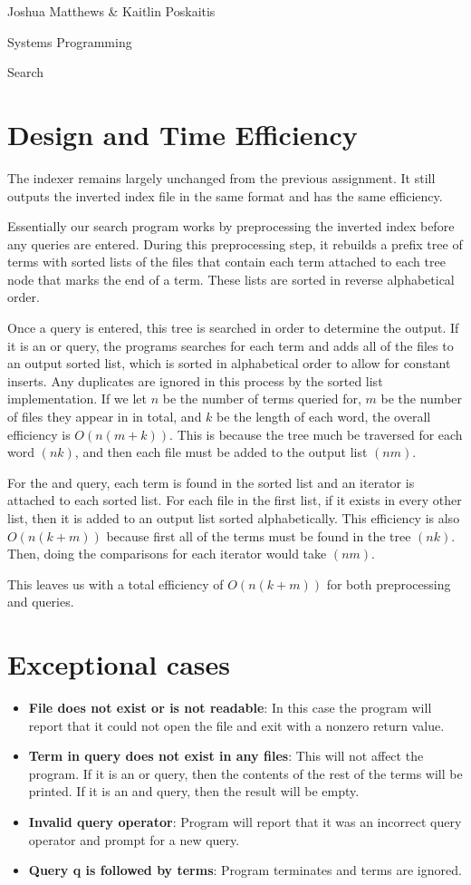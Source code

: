 \documentclass[letterpaper,12pt]{article}
\begin{document}
\noindent Joshua Matthews \& Kaitlin Poskaitis

\noindent Systems Programming

\noindent Search

\section*{Design and Time Efficiency}
The indexer remains largely unchanged from the previous assignment.  It still
outputs the inverted index file in the same format and has the same efficiency.

Essentially our search program works by preprocessing the inverted index before
any queries are entered. During this preprocessing step, it rebuilds a prefix
tree of terms with sorted lists of the files that contain each term attached to
each tree node that marks the end of a term.  These lists are sorted in reverse
alphabetical order.

Once a query is entered, this tree is searched in order to determine the output.
If it is an or query, the programs searches for each term and adds all of the
files to an output sorted list, which is sorted in alphabetical order to allow
for constant inserts.  Any duplicates are ignored in this process by the sorted
list implementation.  If we let $n$ be the number of terms queried for, $m$ be the
number of files they appear in in total, and $k$ be the length of each word, the
overall efficiency is $O(n(m+k))$.  This is because the tree much be traversed for
each word $(nk)$, and then each file must be added to the output list $(nm)$.

For the and query, each term is found in the sorted list and an iterator is
attached to each sorted list. For each file in the first list, if it exists in
every other list, then it is added to an output list sorted alphabetically. This
efficiency is also $O(n(k+m))$ because first all of the terms must be found in
the tree $(nk)$.  Then, doing the comparisons for each iterator would take
$(nm)$.

This leaves us with a total efficiency of $O(n(k+m))$ for both preprocessing and
queries.

\section*{Exceptional cases}
\begin{itemize}
    \item {\bf File does not exist or is not readable}: In this case the program
    will report that it could not open the file and exit with a nonzero return
    value.
    \item {\bf Term in query does not exist in any files}: This will not affect
    the program. If it is an or query, then the contents of the rest of the
    terms will be printed. If it is an and query, then the result will be empty.
    \item {\bf Invalid query operator}: Program will report that it was an
    incorrect query operator and prompt for a new query.
    \item {\bf Query q is followed by terms}: Program terminates and terms are
    ignored.
\end{itemize}
\end{document}
